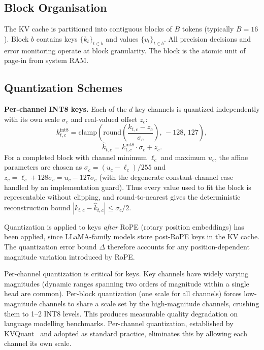 \documentclass[10pt,twocolumn,a4paper]{article}
\theoremstyle{definition}
\theoremstyle{remark}
\begin{document}
\subsection{Block Organisation}

The KV cache is partitioned into contiguous blocks of $B$ tokens (typically $B = 16$).  Block $b$ contains keys $\{k_t\}_{t \in b}$ and values $\{v_t\}_{t \in b}$.  All precision decisions and error monitoring operate at block granularity.  The block is the atomic unit of page-in from system RAM.

\subsection{Quantization Schemes}
\label{sec:quant_schemes}

\textbf{Per-channel INT8 keys.}  Each of the $d$ key channels is quantized independently with its own scale $\sigma_c$ and real-valued offset $z_c$:
\begin{equation}
  k_{t,c}^{\mathrm{int8}} = \mathrm{clamp}\!\left(\mathrm{round}\!\left(\frac{k_{t,c} - z_c}{\sigma_c}\right),\, -128,\, 127\right),
\end{equation}
\begin{equation}
  \hat{k}_{t,c} = k_{t,c}^{\mathrm{int8}} \cdot \sigma_c + z_c.
\end{equation}
For a completed block with channel minimum $\ell_c$ and maximum $u_c$, the affine parameters are chosen as $\sigma_c=(u_c-\ell_c)/255$ and $z_c=\ell_c+128\sigma_c=u_c-127\sigma_c$ (with the degenerate constant-channel case handled by an implementation guard).  Thus every value used to fit the block is representable without clipping, and round-to-nearest gives the deterministic reconstruction bound $|k_{t,c}-\hat{k}_{t,c}|\leq \sigma_c/2$.

Quantization is applied to keys \emph{after} RoPE (rotary position embeddings) has been applied, since LLaMA-family models store post-RoPE keys in the KV cache.  The quantization error bound $\Delta$ therefore accounts for any position-dependent magnitude variation introduced by RoPE\@.

Per-channel quantization is critical for keys.  Key channels have widely varying magnitudes (dynamic ranges spanning two orders of magnitude within a single head are common).  Per-block quantization (one scale for all channels) forces low-magnitude channels to share a scale set by the high-magnitude channels, crushing them to 1--2 INT8 levels.  This produces measurable quality degradation on language modelling benchmarks.  Per-channel quantization, established by KVQuant~\cite{kvquant} and adopted as standard practice, eliminates this by allowing each channel its own scale.
\end{document}
